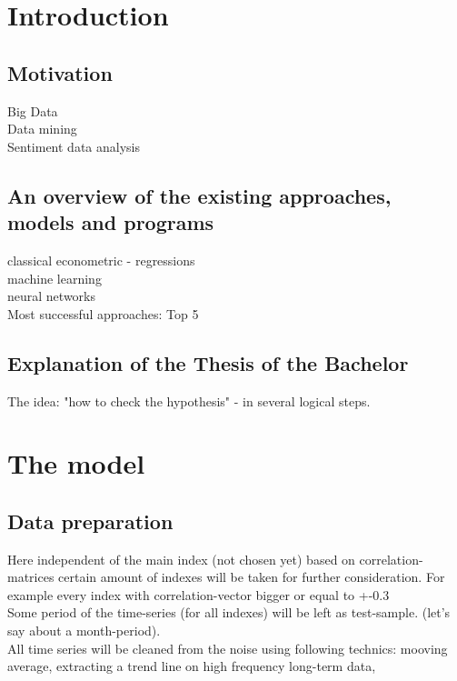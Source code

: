 \documentclass {article}
\begin{document}
\newpage
\section{Introduction}
\subsection{Motivation}
Big Data\\
Data mining\\
Sentiment data analysis
\subsection{An overview of the existing approaches, models and programs}
classical econometric - regressions\\

machine learning\\
neural networks\\
Most successful approaches: Top 5
\subsection{Explanation of the Thesis of the Bachelor}
The idea: "how to check the hypothesis" - in several logical steps.

\newpage
\section{The model}
\subsection{Data preparation}
Here independent of the main index (not chosen yet) based on correlation-matrices certain amount of indexes will be taken for further consideration. For example every index with correlation-vector bigger or equal to +-0.3\\
Some period of the time-series (for all indexes) will be left as test-sample. (let's say about a month-period).\\
All time series will be cleaned from the noise using following technics: mooving average, extracting a trend line on high frequency long-term data, 
\end{document}

